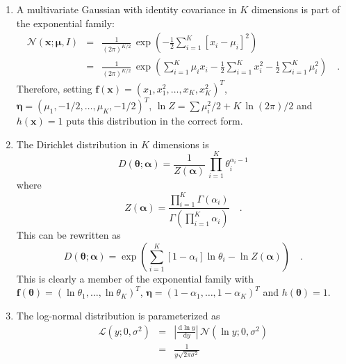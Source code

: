 \documentclass[11pt]{article}
\newcommand{\bvec}[1]{\ensuremath{\boldsymbol{#1}}}
\renewcommand{\vector}[1]{\bvec{#1}}
\renewcommand{\matrix}[1]{\ensuremath{#1}}
\newcommand{\normal}[1]{\ensuremath{\mathcal{N}(#1)}}
\newcommand{\lognormal}[1]{\ensuremath{\mathcal{L}(#1)}}
\newcommand{\dd}{\ensuremath{\, \mathrm{d}}}
\begin{document}
\begin{enumerate}
    \item{A multivariate Gaussian with identity covariance in $K$ dimensions
        is part of the exponential family:
        \begin{eqnarray}
            \normal{\vector{x}; \vector{\mu}, \matrix{I}} &=& \frac{1}{(2\pi)^{K/2}} \,
                \exp \left (-\frac{1}{2} \sum_{i=1}^{K} [x_i-\mu_i]^2 \right )
                \\ &=& \frac{1}{(2\pi)^{K/2}} \, \exp \left (
                    \sum_{i=1}^K \mu_i x_i - \frac{1}{2}\sum_{i=1}^K x_i^2
                     - \frac{1}{2}\sum_{i=1}^K \mu_i^2
                \right ) \quad .
        \end{eqnarray}
        Therefore, setting
        $\vector{f}(\vector{x}) = (x_1, x_1^2, \ldots, x_K, x_K^2)^T$,
        $\vector{\eta} = (\mu_1, -1/2, \ldots, \mu_K, -1/2)^T$,
        $\ln Z = \sum\mu_i^2/2 + K \, \ln (2 \pi)/2$ and $h(\vector{x}) = 1$
        puts this distribution in the correct form.
    }
    \item{The Dirichlet distribution in $K$ dimensions is
        \begin{equation}
            D (\vector{\theta}; \vector{\alpha}) = \frac{1}{Z(\vector{\alpha})}
            \, \prod_{i=1}^{K} \theta_i^{\alpha_i - 1}
        \end{equation}
        where
        \begin{equation}
            Z(\vector{\alpha}) = \frac{\prod_{i=1}^K \Gamma (\alpha_i)}%
            {\Gamma\left ( \prod_{i=1}^{K} \alpha_i \right )} \quad .
        \end{equation}
        This can be rewritten as
        \begin{equation}
            D (\vector{\theta}; \vector{\alpha}) =
                \exp \left ( \sum_{i=1}^{K} [1-\alpha_i] \ln \theta_i
                -\ln Z(\vector{\alpha}) \right ) \quad .
        \end{equation}
        This is clearly a member of the exponential family with
        $\vector{f}(\vector{\theta}) = (\ln \theta_1, \ldots, \ln \theta_K)^T$,
        $\vector{\eta} = (1-\alpha_1, \ldots, 1-\alpha_K)^T$ and
        $h(\vector{\theta}) = 1$.
    }
    \item{The log-normal distribution is parameterized as
        \begin{eqnarray}
            \lognormal{y; 0, \sigma^2} &=&
            \left | \frac{\dd \ln y}{\dd y} \right | \, \normal{\ln y; 0, \sigma^2}
            \\ &=& \frac{1}{y \sqrt{2 \pi \sigma^2}} \,

\end{eqnarray}}
\end{enumerate}
\end{document}
